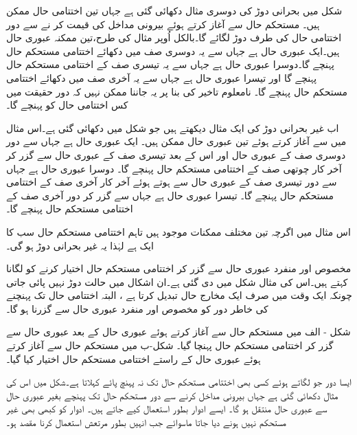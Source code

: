 شکل میں بحرانی دوڑ کی دوسری مثال دکھائی گئی ہے جہاں تین اختتامی  حال  ممکن ہیں۔ مستحکم حال   سے آغاز کرتے ہوئے بیرونی مداخل   کی قیمت   کر نے سے دور اختتامی حال کی طرف دوڑ لگائے گا۔بالکل اُوپر مثال کی طرح،تین ممکنہ عبوری  حال  ہیں۔ایک عبوری  حال  ہے جہاں سے یہ دوسری صف میں دکھائے اختتامی مستحکم حال   پہنچے گا۔دوسرا عبوری  حال   ہے جہاں سے یہ تیسری صف کے اختتامی مستحکم حال   پہنچے گا اور تیسرا عبوری  حال  ہے جہاں سے یہ آخری صف میں دکھائے اختتامی مستحکم حال   پہنچے گا۔ نامعلوم  تاخیر کی بنا پر یہ جاننا ممکن نہیں کہ دور  حقیقت  میں کس اختتامی حال  کو پہنچے گا۔

اب غیر بحرانی دوڑ کی ایک مثال  دیکھتے ہیں جو شکل   میں دکھائی گئی ہے۔اس مثال میں   سے  آغاز کرتے  ہوئے تین عبوری حال  ممکن ہیں۔ ایک عبوری حال    ہے جہاں سے دور دوسری صف کے عبوری حال   اور  اس کے بعد  تیسری صف کے عبوری حال   سے  گزر کر آخر کار  چوتھی صف کے اختتامی مستحکم حال    پہنچے گا۔ دوسرا  عبوری حال   ہے جہاں سے   دور تیسری صف کے عبوری حال   سے ہوتے ہوئے آخر کار آخری صف کے اختتامی مستحکم حال      پہنچے گا۔  تیسرا عبوری حال   ہے جہاں سے  گزر کر دور   آخری صف کے اختتامی مستحکم حال   پہنچے گا۔

اس مثال میں اگرچہ تین مختلف ممکنات موجود ہیں تاہم  اختتامی مستحکم حال سب کا ایک   ہے لہٰذا  یہ غیر بحرانی دوڑ  ہو گی۔  

 مخصوص اور منفرد عبوری حال   سے گزر کر اختتامی مستحکم  حال  اختیار کرنے کو  لگانا کہتے ہیں۔اس کی  مثال شکل  میں دی گئی ہے۔ان  اشکال میں حالت  دوڑ  نہیں پائی جاتی چونکہ ایک وقت میں صرف ایک مخارج حال تبدیل کرتا ہے ، البتہ اختتامی حال تک پہنچنے کی خاطر دور کو مخصوص اور منفرد عبوری حال   سے گزرنا ہو گا۔

شکل - الف  میں   مستحکم حال  سے  آغاز کرتے ہوئے عبوری حال    کے بعد عبوری حال  سے  گزر کر اختتامی مستحکم  حال    پہنچا گیا۔   شکل-ب میں مستحکم حال    سے  آغاز کرتے ہوئے عبوری حال    کے راستے  اختتامی  مستحکم حال   اختیار کیا  گیا۔


 ایسا دور جو   لگاتے ہوئے کسی بھی اختتامی مستحکم حال تک نہ پہنچ پائے   کہلاتا ہے۔شکل  میں اس کی مثال دکھائی گئی ہے جہاں بیرونی مداخل    کرنے سے دور   مستحکم حال تک پہنچے بغیر عبوری حال  سے عبوری حال  منتقل ہو گا۔	ایسے  ادوار بطور استعمال کیے جاتے ہیں۔ ادوار کو کبھی بھی غیر مستحکم نہیں ہونے دیا جاتا ماسوائے جب انہیں بطور مرتعش استعمال کرنا مقصد ہو۔

